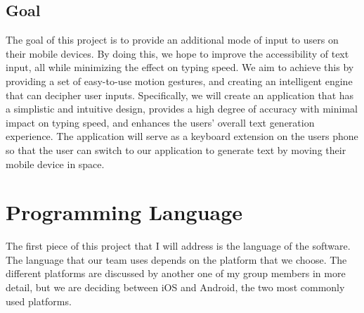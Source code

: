 \documentclass[onecolumn, draftclsnofoot,10pt, journal, letterpaper]{IEEEtran}
\begin{document}
    \subsection{Goal} 
        The goal of this project is to provide an additional mode of input to users on their mobile devices. By doing this, we hope to improve the accessibility of text input, all while minimizing the effect on typing speed. We aim to achieve this by providing a set of easy-to-use motion gestures, and creating an intelligent engine that can decipher user inputs. Specifically, we will create an application that has a simplistic and intuitive design, provides a high degree of accuracy with minimal impact on typing speed, and enhances the users' overall text generation experience. The application will serve as a keyboard extension on the users phone so that the user can switch to our application to generate text by moving their mobile device in space.  
        
\section{Programming Language}
    The first piece of this project that I will address is the language of the software. The language that our team uses depends on the platform that we choose. The different platforms are discussed by another one of my group members in more detail, but we are deciding between iOS and Android, the two most commonly used platforms. 
    
\end{document}
